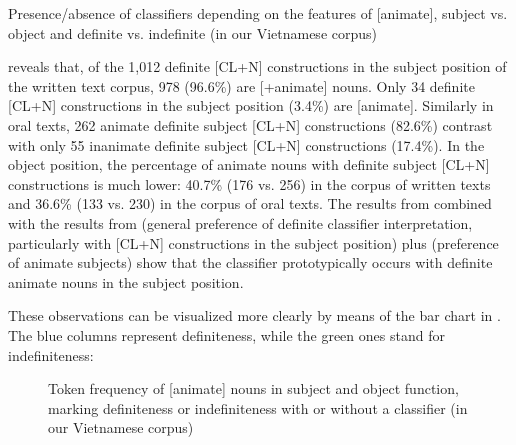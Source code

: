 \documentclass[output=paper]{langsci/langscibook}
\begin{document}
\begin{table}
\caption{Presence/absence of classifiers depending on the features of [\pm animate], subject vs. object and definite vs. indefinite (in our Vietnamese corpus)}\label{1table:6}
\end{table}

 reveals that, of the 1,012 definite [CL+N] constructions in the subject position of the written text corpus, 978 (96.6\%) are [+animate] nouns. Only 34 definite [CL+N] constructions in the subject position (3.4\%) are [\minus animate]. Similarly in oral texts, 262 animate definite subject [CL+N] constructions (82.6\%) contrast with only 55 inanimate definite subject [CL+N] constructions (17.4\%). In the object position, the percentage of animate nouns with definite subject [CL+N] constructions is much lower: 40.7\% (176 vs. 256) in the corpus of written texts and 36.6\% (133 vs. 230) in the corpus of oral texts. The results from  combined with the results from  (general preference of definite classifier interpretation, particularly with [CL+N] constructions in the subject position) plus  (preference of animate subjects) show that the classifier prototypically occurs with definite animate nouns in the subject position.

These observations can be visualized more clearly by means of the bar chart in . The blue columns represent definiteness, while the green ones stand for indefiniteness:

\begin{figure}
\dataset
{}

\caption{Token frequency of [\pm animate] nouns in subject and object function, marking definiteness or indefiniteness with or without a classifier (in our Vietnamese corpus)}\label{1fig:1}
\end{figure}
\end{document}
